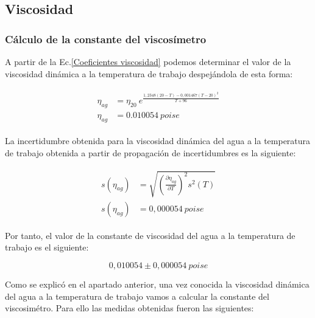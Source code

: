 \documentclass[a4paper,12pt,titlepage]{article}
\begin{document}
\newpage

\subsection{Viscosidad}

\subsubsection{Cálculo de la constante del viscosímetro}

A partir de la Ec.\ref{Coeficientes viscosidad} podemos determinar el valor de la viscosidad dinámica a la temperatura de trabajo despejándola de esta forma:

\begin{align}
    \begin{split}   %
    \eta_{ag} &= \eta_{20}\: e^{\frac{1,2348(20-T)-0,001467(T-20)^2}{T+96}} \\
    \eta_{ag} &= 0.010054 \: poise
    \end{split}
\end{align}

La incertidumbre obtenida para la viscosidad dinámica del agua a la temperatura de trabajo obtenida a partir de propagación de incertidumbres es la siguiente:

\begin{align}
    \begin{split}
    s(\eta_{ag}) &= \sqrt{\left (\frac{\partial \eta_{ag}}{\partial T}\right )^2 s^2(T)} \\
    s(\eta_{ag}) &= 0,000054 \:poise
    \end{split}
\end{align}

Por tanto, el valor de la constante de viscosidad del agua a la temperatura de trabajo es el siguiente:

\begin{equation}
    0,010054 \pm 0,000054 \: poise
\end{equation}

Como se explicó en el apartado anterior, una vez conocida la viscosidad dinámica del agua a la temperatura de trabajo vamos a calcular la constante del viscosimétro. Para ello las medidas obtenidas fueron las siguientes:
\end{document}
